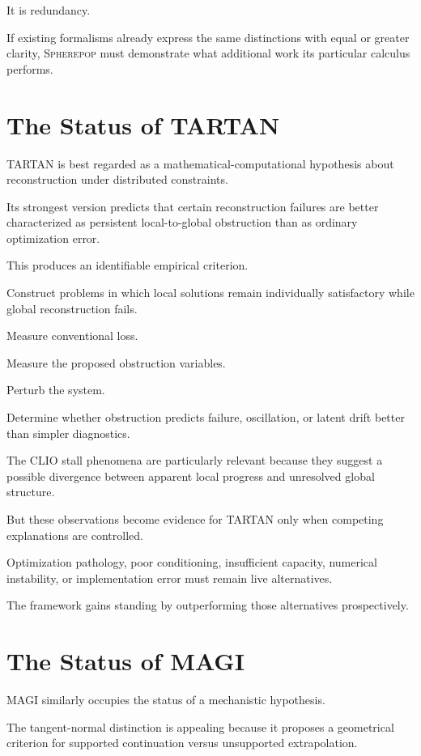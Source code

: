 \documentclass[11pt]{article}
\theoremstyle{remark}
\newcommand{\TARTAN}{\textsc{TARTAN}}
\newcommand{\MAGI}{\textsc{MAGI}}
\newcommand{\Spherepop}{\textsc{Spherepop}}
\begin{document}
It is redundancy.

If existing formalisms already express the same distinctions with equal or
greater clarity, \Spherepop{} must demonstrate what additional work its
particular calculus performs.

\section{The Status of TARTAN}

\TARTAN{} is best regarded as a mathematical-computational hypothesis about
reconstruction under distributed constraints.

Its strongest version predicts that certain reconstruction failures are better
characterized as persistent local-to-global obstruction than as ordinary
optimization error.

This produces an identifiable empirical criterion.

Construct problems in which local solutions remain individually satisfactory
while global reconstruction fails.

Measure conventional loss.

Measure the proposed obstruction variables.

Perturb the system.

Determine whether obstruction predicts failure, oscillation, or latent drift
better than simpler diagnostics.

The CLIO stall phenomena are particularly relevant because they suggest a
possible divergence between apparent local progress and unresolved global
structure.

But these observations become evidence for \TARTAN{} only when competing
explanations are controlled.

Optimization pathology, poor conditioning, insufficient capacity, numerical
instability, or implementation error must remain live alternatives.

The framework gains standing by outperforming those alternatives prospectively.

\section{The Status of MAGI}

\MAGI{} similarly occupies the status of a mechanistic hypothesis.

The tangent-normal distinction is appealing because it proposes a geometrical
criterion for supported continuation versus unsupported extrapolation.
\end{document}
